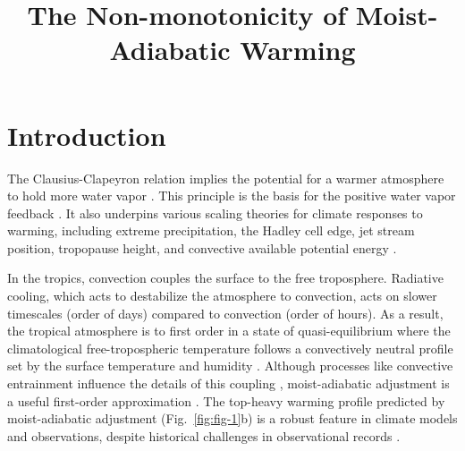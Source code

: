 \documentclass[]{ametsocV6.1}
\title{The Non-monotonicity of Moist-Adiabatic Warming}
\affiliation{\aff{a}{Department of Geosciences, Union College, Schenectady New York, USA}}
\begin{document}
\maketitle

%
\section{Introduction}

The Clausius-Clapeyron relation implies the potential for a warmer atmosphere to hold more water vapor \citep{emanuel1994}. This principle is the basis for the positive water vapor feedback \citep{held2000a}. It also underpins various scaling theories for climate responses to warming, including extreme precipitation, the Hadley cell edge, jet stream position, tropopause height, and convective available potential energy \citep[CAPE;][]{oGorman2015, shaw2016b, romps2016}. 

In the tropics, convection couples the surface to the free troposphere. Radiative cooling, which acts to destabilize the atmosphere to convection, acts on slower timescales (order of days) compared to convection (order of hours). As a result, the tropical atmosphere is to first order in a state of quasi-equilibrium where the climatological free-tropospheric temperature follows a convectively neutral profile set by the surface temperature and humidity \cite{arakawa1974}. Although processes like convective entrainment influence the details of this coupling \citep{miyawaki2020, keil2021}, moist-adiabatic adjustment is a useful first-order approximation \citep{held1993}. The top-heavy warming profile predicted by moist-adiabatic adjustment (Fig.~\ref{fig:fig-1}b) is a robust feature in climate models and observations, despite historical challenges in observational records \citep{vallis2015, santer2005}.
\end{document}
